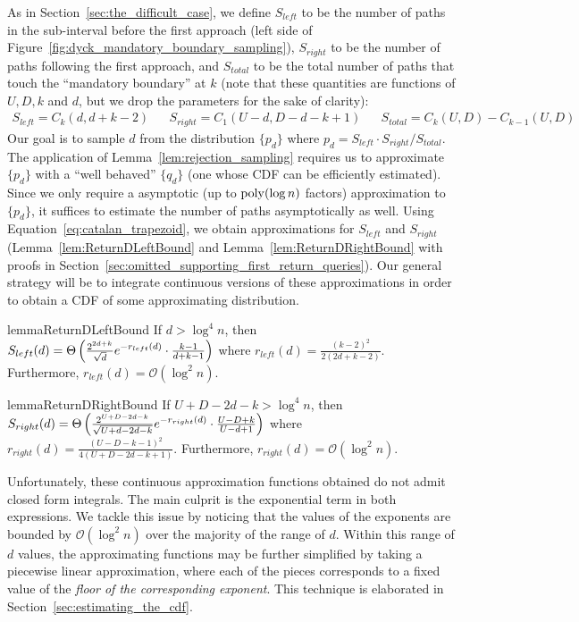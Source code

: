 As in Section~\ref{sec:the_difficult_case}, we define
$S_{left}$ to be the number of paths in the sub-interval before the first approach (left side of Figure~\ref{fig:dyck_mandatory_boundary_sampling}),
$S_{right}$ to be the number of paths following the first approach,
and $S_{total}$ to be the total number of paths that touch the ``mandatory boundary'' at $k$
(note that these quantities are functions of $U,D,k$ and $d$, but we drop the parameters for the sake of clarity):
{\small
\begin{align*}
    S_{left} = C_{k}(d, d+k-2)
    &&S_{right} = C_1(U-d, D-d-k+1)
    &&S_{total} = C_k(U,D) - C_{k-1}(U,D)
\end{align*}}
Our goal is to sample $d$ from the distribution $\{ p_d\}$ where $p_d = S_{left}\cdot S_{right}/S_{total}$.
The application of Lemma~\ref{lem:rejection_sampling} requires us to approximate $\{p_d\}$
with a ``well behaved'' $\{q_d\}$ (one whose CDF can be efficiently estimated).
Since we only require a asymptotic (up to $\mathrm{poly}(\log n)$ factors) approximation to $\{p_d\}$,
it suffices to estimate the number of paths asymptotically as well.
Using Equation~\ref{eq:catalan_trapezoid}, we obtain approximations for $S_{left}$ and $S_{right}$
(Lemma~\ref{lem:ReturnDLeftBound} and Lemma~\ref{lem:ReturnDRightBound} with proofs in Section~\ref{sec:omitted_supporting_first_return_queries}).
Our general strategy will be to integrate continuous versions of these approximations in order to obtain a CDF of some approximating distribution.
\begin{restatable}{lemma}{ReturnDLeftBound}
\label{lem:ReturnDLeftBound}
If $d > \log^4 n$, then $S_{left}(d)
= \Theta\left( \frac{2^{2d+k}}{\sqrt{d}}\mathlarger e^{-r_{left}(d)}\cdot \frac{k-1}{d+k-1}\right)$
where $r_{left}(d) = \frac{(k-2)^2}{2(2d+k-2)}$.
Furthermore, $r_{left}(d)=\mathcal O(\log^2 n)$.
\end{restatable}

\begin{restatable}{lemma}{ReturnDRightBound}
\label{lem:ReturnDRightBound}
If $U+D-2d-k > \log^4 n$, then $S_{right}(d)
= \Theta\left( \frac{2^{U+D-2d-k}}{\sqrt{U+d-2d-k}}\mathlarger e^{-r_{right}(d)}\cdot \frac{U-D+k}{U-d+1}\right)$
where $r_{right}(d) = \frac{(U-D-k-1)^2}{4(U+D-2d-k+1)}$.
Furthermore, $r_{right}(d)=\mathcal O(\log^2 n)$.
\end{restatable}

Unfortunately, these continuous approximation functions obtained do not admit closed form integrals.
The main culprit is the exponential term in both expressions.
We tackle this issue by noticing that the values of the exponents are bounded by $\mathcal O(\log^2 n)$ over the majority of the range of $d$.
Within this range of $d$ values, the approximating functions may be further simplified by taking a piecewise linear approximation,
where each of the pieces corresponds to a fixed value of the \emph{floor of the corresponding exponent}.
This technique is elaborated in Section~\ref{sec:estimating_the_cdf}.

